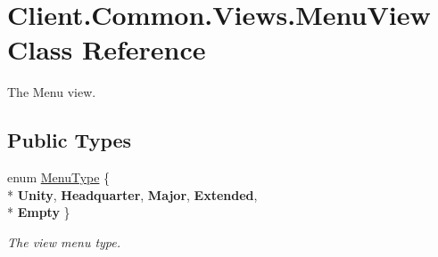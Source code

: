 \hypertarget{classClient_1_1Common_1_1Views_1_1MenuView}{}\section{Client.\+Common.\+Views.\+Menu\+View Class Reference}
\label{classClient_1_1Common_1_1Views_1_1MenuView}


The Menu view.  


\subsection*{Public Types}
\begin{DoxyCompactItemize}
\item 
enum \hyperlink{classClient_1_1Common_1_1Views_1_1MenuView_a63db164d71105de8543e3992db8c9a1c}{Menu\+Type} \{ \\*
{\bfseries Unity}, 
{\bfseries Headquarter}, 
{\bfseries Major}, 
{\bfseries Extended}, 
\\*
{\bfseries Empty}
 \}\begin{DoxyCompactList}\small\item\em The view menu type. \end{DoxyCompactList}
\end{DoxyCompactItemize}
